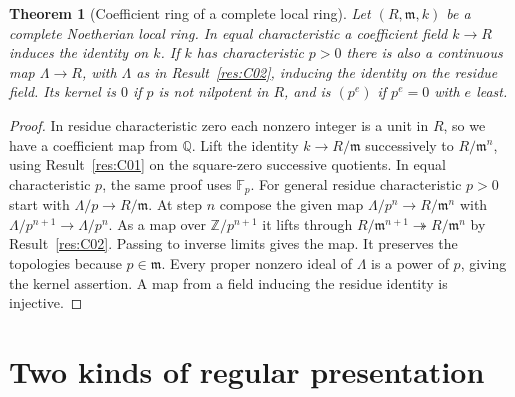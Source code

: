 \documentclass[11pt,oneside,openany]{book}
\newtheorem{theorem}{Theorem}[chapter]
\theoremstyle{definition}
\theoremstyle{remark}
\begin{document}
\begin{theorem}[Coefficient ring of a complete local ring]\label{res:C03}
Let \((R,\mathfrak m,k)\) be a complete Noetherian local ring.
In equal characteristic a coefficient field \(k\to R\) induces the
identity on \(k\). If \(k\) has characteristic \(p>0\) there is also
a continuous map \(\Lambda\to R\), with \(\Lambda\) as in
Result~\ref{res:C02}, inducing the identity on the residue field.
Its kernel is \(0\) if \(p\) is not nilpotent in \(R\), and is
\((p^e)\) if \(p^e=0\) with \(e\) least.
\end{theorem}
\begin{proof}
In residue characteristic zero each nonzero integer is a unit in
\(R\), so we have a coefficient map from \(\mathbb Q\).
Lift the identity \(k\to R/\mathfrak m\) successively to
\(R/\mathfrak m^n\), using Result~\ref{res:C01} on the square-zero
successive quotients. In equal characteristic \(p\), the same proof
uses \(\mathbb F_p\).
For general residue characteristic \(p>0\) start with
\(\Lambda/p\to R/\mathfrak m\). At step \(n\) compose the given map
\(\Lambda/p^n\to R/\mathfrak m^n\) with
\(\Lambda/p^{n+1}\to\Lambda/p^n\).
As a map over \(\mathbb Z/p^{n+1}\) it lifts through
\(R/\mathfrak m^{n+1}\twoheadrightarrow R/\mathfrak m^n\) by
Result~\ref{res:C02}. Passing to inverse limits gives the map.
It preserves the topologies because \(p\in\mathfrak m\). Every
proper nonzero ideal of \(\Lambda\) is a power of \(p\), giving the
kernel assertion. A map from a field inducing the residue identity
is injective.
\end{proof}

\section{Two kinds of regular presentation}
\end{document}
